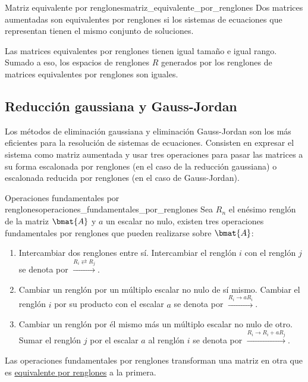 \documentclass{fmbnotes}
\begin{document}
\begin{definicion}{Matriz equivalente por renglones}{matriz_equivalente_por_renglones}
Dos matrices aumentadas son equivalentes por renglones si los sistemas de ecuaciones que representan tienen el mismo conjunto de soluciones.
\end{definicion}

Las matrices equivalentes por renglones tienen igual tamaño e igual rango. Sumado a eso, los espacios de renglones \(R\) generados por los renglones de matrices equivalentes por renglones son iguales.

\subsection{Reducción gaussiana y Gauss-Jordan}
Los métodos de eliminación gaussiana y eliminación Gauss-Jordan son los más eficientes para la resolución de sistemas de ecuaciones. Consisten en expresar el sistema como matriz aumentada y usar tres operaciones para pasar las matrices a su forma escalonada por renglones (en el caso de la reducción gaussiana) o escalonada reducida por renglones (en el caso de Gauss-Jordan).  

\begin{definicion}{Operaciones fundamentales por renglones}{operaciones_fundamentales_por_renglones}
Sea \(R_n\) el enésimo renglón de la matriz \(\bmat{A}\) y \(a\) un escalar no nulo, existen tres operaciones fundamentales por renglones que pueden realizarse sobre \(\bmat{A}\):
\begin{enumerate}
\item Intercambiar dos renglones entre sí. Intercambiar el renglón \(i\) con el renglón \(j\) se denota por \(\xrightarrow{R_i \rightleftarrows R_j}\).
\item Cambiar un renglón por un múltiplo escalar no nulo de sí mismo. Cambiar el renglón \(i\) por su producto con el escalar \(a\) se denota por \(\xrightarrow{R_i \to aR_i}\).
\item Cambiar un renglón por él mismo más un múltiplo escalar no nulo de otro. Sumar el renglón \(j\) por el escalar \(a\) al renglón \(i\) se denota por \(\xrightarrow{R_i \to R_i+aR_j}\).
\end{enumerate}
Las operaciones fundamentales por renglones transforman una matriz en otra que es \hyperlink{def:matriz_equivalente_por_renglones}{equivalente por renglones} a la primera. 
\end{definicion} 
\end{document}
